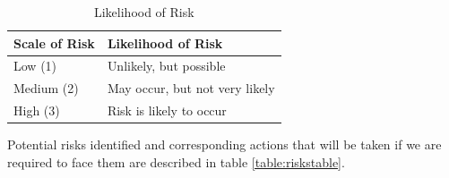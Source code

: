 \documentclass{article}
\begin{document}
\begin{table}[h]
\begin{center}
\begin{small}
\begin{tabular}{|l|p{3cm}|}
\hline
\rowcolor[HTML]{C0C0C0}Scale of Risk & Likelihood of Risk                     \\ \hline
Low (1)    & Unlikely, but possible                                            \\ \hline
Medium (2) & May occur, but not very likely                                    \\ \hline
High (3)   & Risk is likely to occur                                           \\ \hline
\end{tabular}
\end{small}
\end{center}
\caption{Likelihood of Risk}
\label{table:likelihood}
\end{table}

Potential risks identified and corresponding actions that will be taken if we are required to face them are described in table \ref{table:riskstable}.
\end{document}
